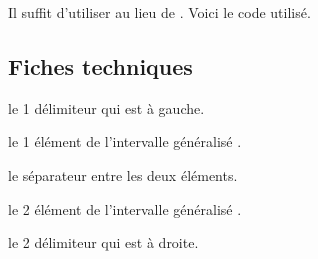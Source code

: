 \documentclass[12pt,a4paper]{article}
\begin{document}
Il suffit d'utiliser  au lieu de . Voici le code utilisé.

\begin{latexex-alone}
\newcommand\myinter[2]{%
    \tns@generic@interval@semi@ext{\{}%
                                  {#1}{::}{#2}%
                                  {)}%
}
\end{latexex-alone}




\subsection{Fiches techniques}




 le 1\ier{} délimiteur qui est à gauche.

 le 1\ier{} élément de l'intervalle \og généralisé \fg.

 le séparateur entre les deux éléments.

 le 2\ieme{} élément de l'intervalle \og généralisé \fg.

 le 2\ier{} délimiteur qui est à droite.
\end{document}
